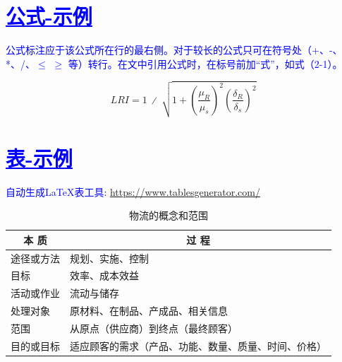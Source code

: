 \section{\textcolor{blue}{\underline{\underline{公式-示例}}}}

\textcolor{blue}{公式标注应于该公式所在行的最右侧。对于较长的公式只可在符号处（+、-、*、/、$\leqslant$ $\geqslant$ 等）转行。在文中引用公式时，在标号前加“式”，如式（2-1）。}


\begin{equation}
    LRI=1\ ∕\ \sqrt{ 1 + {\left(\frac{{\mu}_{R}}{{\mu}_{s}}\right)^{2}}{\left(\frac{{\delta}_{R}}{{\delta}_{s}}\right)^{2}} }
\end{equation}

\section{\textcolor{blue}{\underline{\underline{表-示例}}}}

\textcolor{blue}{{自动生成LaTeX表工具: \url{https://www.tablesgenerator.com/}}}

\begin{table}[htbp]
  \linespread{1.5}
  \songti
  \centering
  \caption{物流的概念和范围}\label{物流的概念和范围}
  \begin{tabular}{|l|l|}
  \hline
  \multicolumn{1}{|c|}{本 质} & \multicolumn{1}{c|}{过  程}  \\ \hline
  途径或方法                     & 规划、实施、控制                   \\ \hline
  目标                        & 效率、成本效益                    \\ \hline
  活动或作业                     & 流动与储存                      \\ \hline
  处理对象                      & 原材料、在制品、产成品、相关信息           \\ \hline
  范围                        & 从原点（供应商）到终点（最终顾客）          \\ \hline
  目的或目标                     & 适应顾客的需求（产品、功能、数量、质量、时间、价格） \\ \hline
  \end{tabular}
\end{table}

